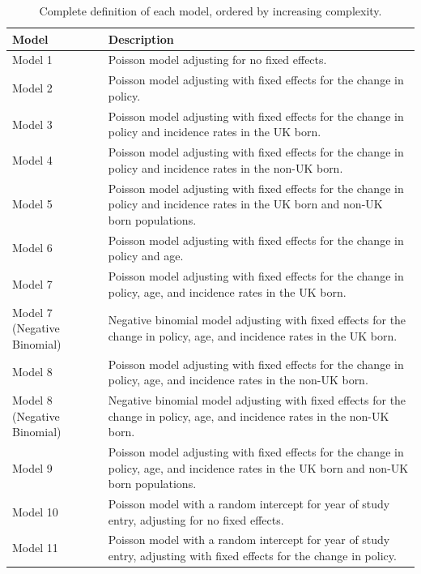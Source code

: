 \documentclass[11pt,twoside]{bristolthesis}
\begin{document}
  \begin{table}[!h]
  
  \caption{\label{tab:07-model-spec}Complete definition of each model, ordered by increasing complexity.}
  \centering
  \fontsize{8}{10}\selectfont
  \begin{tabular}{>{\raggedright\arraybackslash}p{2cm}>{\raggedright\arraybackslash}p{10cm}}
  \toprule
  Model & Description\\
  \midrule
  Model 1 & Poisson model adjusting for no fixed effects.\\
  Model 2 & Poisson model adjusting with fixed effects for 
                            the change in policy.\\
  Model 3 & Poisson model adjusting with fixed effects for the change in policy and incidence rates in the UK born.\\
  Model 4 & Poisson model adjusting with fixed effects for the change in policy and incidence rates in the non-UK born.\\
  Model 5 & Poisson model adjusting with fixed effects for the change in policy and incidence rates in the UK born and non-UK born populations.\\
  \addlinespace
  Model 6 & Poisson model adjusting with fixed effects for the change in policy and age.\\
  Model 7 & Poisson model adjusting with fixed effects for the change in policy, age, and incidence rates in the UK born.\\
  Model 7 (Negative Binomial) & Negative binomial model adjusting with fixed effects for the change in policy, age, and incidence rates in the UK born.\\
  Model 8 & Poisson model adjusting with fixed effects for the change in policy, age, and incidence rates in the non-UK born.\\
  Model 8 (Negative Binomial) & Negative binomial model adjusting with fixed effects for the change in policy, age, and incidence rates in the non-UK born.\\
  \addlinespace
  Model 9 & Poisson model adjusting with fixed effects for the change in policy, age, and incidence rates in the UK born and non-UK born populations.\\
  Model 10 & Poisson model with a random intercept for year of study entry, adjusting for no fixed effects.\\
  Model 11 & Poisson model with a random intercept for year of study entry, adjusting with fixed effects for 
                            the change in policy.\\

\end{tabular}
\end{table}
\end{document}

